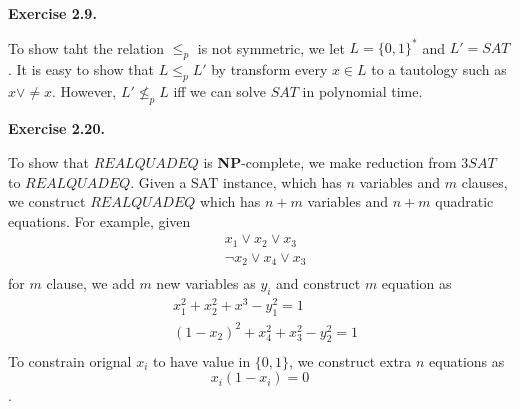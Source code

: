 \documentclass[a4paper]{article}
\newenvironment{exercise}[1]{
	\par
	\noindent\textbf{Exercise #1.}\quad
}{
	\par
	\bigskip
}
\begin{document}
\begin{exercise}{2.9}
	To show taht the relation $\leq_p$ is not symmetric, we let $L=\{0,1\}^*$ and $L'=SAT$. It is easy to show that $L\leq_p L'$ by transform every $x\in L$ to a tautology such as $x\vee \neq x$. However, $L'\not\leq_p L$ iff we can solve $SAT$ in polynomial time.
\end{exercise}

\begin{exercise}{2.20}
To show that $REALQUADEQ$ is \textbf{NP}-complete, we make reduction from $3SAT$ to $REALQUADEQ$.
Given a SAT instance, which has $n$ variables and $m$ clauses, we construct $REALQUADEQ$ which has $n+m$ variables and $n+m$ quadratic equations. For example, given
\begin{align*}
& x_1\vee x_2\vee x_3\\
&\neg x_2\vee x_4\vee x_3\\
\end{align*}
for $m$ clause, we add $m$ new variables as $y_i$ and construct $m$ equation as 
\begin{align*}
&x_1^2+x_2^2+x^3-y_1^2=1\\
&(1-x_2)^2+x_4^2+x_3^2-y_2^2=1\\
\end{align*}
To constrain orignal $x_i$ to have value in $\{0,1\}$, we construct extra $n$ equations as 
$$x_i(1-x_i)=0$$.
\end{exercise}
\end{document}
